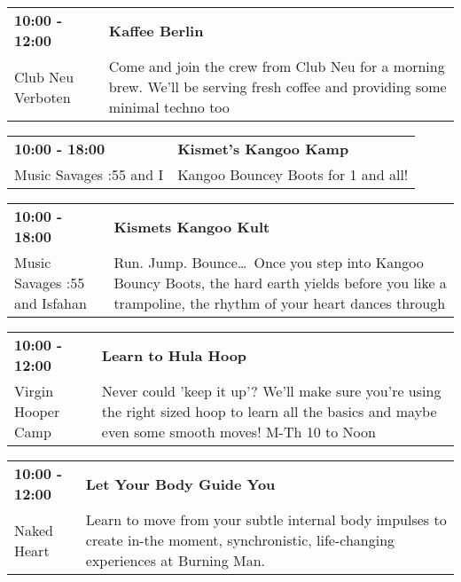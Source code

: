 \begin{tabular}{ p{1in} p{2.2in} }
    \textbf{10:00 - 12:00} & \textbf{Kaffee Berlin } \\
    Club Neu Verboten \newline  & Come and join the crew from Club Neu for a morning brew. We'll be serving fresh coffee and providing some minimal techno too \\
    \hline 
\end{tabular}
    
\begin{tabular}{ p{1in} p{2.2in} }
    \textbf{10:00 - 18:00} & \textbf{Kismet's Kangoo Kamp} \\
    Music Savages \newline 8:55 and I & Kangoo Bouncey Boots for 1 and all! \\
    \hline 
\end{tabular}
    
\begin{tabular}{ p{1in} p{2.2in} }
    \textbf{10:00 - 18:00} & \textbf{Kismets Kangoo Kult} \\
    Music Savages \newline 8:55 and Isfahan & Run. Jump. Bounce\ldots\ Once you step into Kangoo Bouncy Boots, the hard earth yields before you like a trampoline, the rhythm of your heart dances through \\
    \hline 
\end{tabular}
    
\begin{tabular}{ p{1in} p{2.2in} }
    \textbf{10:00 - 12:00} & \textbf{Learn to Hula Hoop} \\
    Virgin Hooper Camp \newline  & Never could 'keep it up'? We'll make sure you're using the right sized hoop to learn all the basics and maybe even some smooth moves! M-Th 10 to Noon \\
    \hline 
\end{tabular}
    
\begin{tabular}{ p{1in} p{2.2in} }
    \textbf{10:00 - 12:00} & \textbf{Let Your Body Guide You} \\
    Naked Heart \newline  & Learn to move from your subtle internal body impulses to create in-the moment, synchronistic, life-changing experiences at Burning Man. \\
    \hline 
\end{tabular}
    
